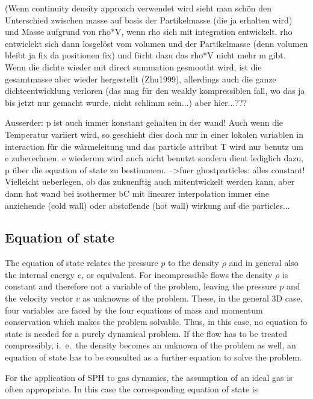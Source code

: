 \documentclass{report}
\begin{document}
(Wenn continuity density approach verwendet wird sieht man schön den Unterschied zwischen masse auf basis der Partikelmasse (die ja erhalten wird) und Masse aufgrund von rho*V, wenn rho sich mit integration entwickelt. rho entwiclekt sich dann losgelöst vom volumen und der Partikelmasse (denn volumen bleibt ja fix da positionen fix)
und fürht dazu das rho*V nicht mehr m gibt. Wenn die dichte wieder mit direct summation gesmootht wird, ist die gesamtmasse aber wieder hergestellt (Zhu1999), allerdings auch die ganze dichteentwicklung verloren (das mag für den weakly kompressiblen fall, wo das ja bis jetzt nur gemacht wurde,  nicht schlimm sein...) aber hier...???

Ausserder: p ist auch immer konstant gehalten in der wand! Auch wenn die Temperatur variiert wird, so geschieht dies doch nur in einer lokalen variablen in interaction für die wärmeleitung und das particle attribut T wird nur benutz um e zuberechnen. e wiederum wird auch nicht benutzt sondern dient lediglich dazu, p über die equation of state zu bestimmem. -->fuer ghostparticles: alles constant! Vielleicht ueberlegen, ob das zukuenftig auch mitentwickelt werden kann, aber dann hat wand bei isothermer bC mit linearer interpolation immer eine anziehende (cold wall) oder abstoßende (hot wall) wirkung auf die particles...




\subsection{Equation of state}

The equation of state relates the pressure $p$ 
to the density $\rho$ and in general also the internal energy $e$, or equivalent.
For incompressible flows the density $\rho$ is constant and therefore not a variable of the problem, leaving the pressure $p$ and the velocity vector $v$ as unknowns of the problem. These, in the general 3D case, four variables are faced by the four equations of mass and momentum conservation which makes the problem solvable. Thus, in this case,  no equation fo state is needed for a purely dynamical problem. If the flow has to be treated compressibly, i.\ e.\ the density becomes an unknown of the problem as well, an equation of state has to be consulted as a further equation to solve the problem.  

For the application of SPH to gas dynamics, the assumption of an ideal gas is often
appropriate.
In this case the corresponding equation of state is
\end{document}
